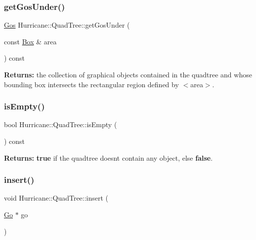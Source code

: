 \mbox{\label{classHurricane_1_1QuadTree_ae6a48f63ef2e6b5ec562afe267c85fe3}} 
\subsubsection{\texorpdfstring{get\+Gos\+Under()}{getGosUnder()}}
{\footnotesize\ttfamily \mbox{\hyperlink{namespaceHurricane_a4456a34f3bc6766d471c3064ace19759}{Gos}} Hurricane\+::\+Quad\+Tree\+::get\+Gos\+Under (\begin{DoxyParamCaption}\item[{const \mbox{\hyperlink{classHurricane_1_1Box}{Box}} \&}]{area }\end{DoxyParamCaption}) const}

{\bfseries Returns\+:} the collection of graphical objects contained in the quadtree and whose bounding box intersects the rectangular region defined by {\ttfamily $<$area$>$}. \mbox{\label{classHurricane_1_1QuadTree_a9d942a3c16a775a9ea576ef7dc753ac9}} 
\subsubsection{\texorpdfstring{is\+Empty()}{isEmpty()}}
{\footnotesize\ttfamily bool Hurricane\+::\+Quad\+Tree\+::is\+Empty (\begin{DoxyParamCaption}{ }\end{DoxyParamCaption}) const\hspace{0.3cm}{\ttfamily [inline]}}

{\bfseries Returns\+:} {\bfseries true} if the quadtree doesn\textquotesingle{}t contain any object, else {\bfseries false}. \mbox{\label{classHurricane_1_1QuadTree_ac39f6a095f3b4148b36b92d2b0906f16}} 
\subsubsection{\texorpdfstring{insert()}{insert()}}
{\footnotesize\ttfamily void Hurricane\+::\+Quad\+Tree\+::insert (\begin{DoxyParamCaption}\item[{\mbox{\hyperlink{classHurricane_1_1Go}{Go}} $\ast$}]{go }\end{DoxyParamCaption})}

